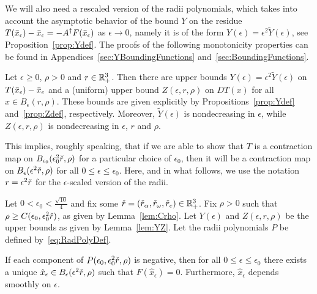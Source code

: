 We will also need a rescaled version of the radii polynomials, which takes into account the asymptotic behavior of the bound $Y$ on the residue $T(\bar{x}_\epsilon) -\bar{x}_\epsilon = - A^\dagger F(\bar{x}_\epsilon)$  as $\epsilon \to 0$, namely it is of the form
$Y(\epsilon)= \epsilon^2 \tilde{Y}(\epsilon)$,
see Proposition~\ref{prop:Ydef}.
The proofs of the following monotonicity properties can be found in 
Appendices~\ref{sec:YBoundingFunctions} and~\ref{sec:BoundingFunctions}. 
\begin{lemma}\label{lem:YZ}
Let $\epsilon \geq 0$, $\rho >0$ 
and $r \in\mathbb{R}^3_+$. 
Then there are upper bounds
$Y(\epsilon) =\epsilon^2 \tilde{Y}(\epsilon)$ on $ T(\bar{x}_\epsilon) - \bar{x}_\epsilon$ and a (uniform) upper bound 
$Z(\epsilon , r ,\rho) $  on $ DT(x) $ for all $ x \in B_\epsilon(r,\rho)$.
These bounds are given explicitly by Propositions~\ref{prop:Ydef} and~\ref{prop:Zdef}, respectively. Moreover, $\tilde{Y}(\epsilon)$ is nondecreasing in $\epsilon$,
while $Z(\epsilon , r ,\rho) $ is nondecreasing in $\epsilon$, $r$ and $\rho$.
\end{lemma}

This implies, roughly speaking, that if we are able to show that $T$ is a contraction map on 
$B_{\epsilon_0}( \epsilon_0^2 \check{r},\rho)$ for a particular choice of $ \epsilon_0$, then it will be a contraction map on $B_\epsilon( \epsilon^2 \check{r},\rho)$ for all $ 0 \leq \epsilon \leq \epsilon_0$. Here, and in what follows, we use the notation $r = \epsilon^2 \check{r}$ for the $\epsilon$-scaled version of the radii. 



\begin{corollary}
	\label{cor:RPUniformEpsilon}
	Let  
	 $0 < \epsilon_0 < \tfrac{\sqrt{10}}{4} $ 
	and fix some $\check{r} = (\check{r}_\alpha, \check{r}_\omega, \check{r}_c) \in \mathbb{R}^3_+$. 
	Fix $\rho > 0$ such that $ \rho \geq C(\epsilon_0, \epsilon_0^2 \check{r})$, as given by Lemma~\ref{lem:Crho}. 
	Let $Y(\epsilon)$ and $Z(\epsilon,r,\rho)$ be the upper bounds as given by Lemma~\ref{lem:YZ}.  
Let the radii polynomials $P$ be defined by~\eqref{eq:RadPolyDef}. 

	If each component of  $P(\epsilon_0,\epsilon_0^2 \check{r},\rho)$ is negative, 
	then for all $ 0 \leq \epsilon \leq \epsilon_0$ 
	there exists a unique $ \hat{x}_\epsilon \in B_\epsilon(\epsilon^2  \check{r} , \rho)$ 
	such that $ F(\hat{x}_\epsilon) =0$. 
	Furthermore, $\hat{x}_\epsilon$ depends smoothly on $\epsilon$.
\end{corollary}

